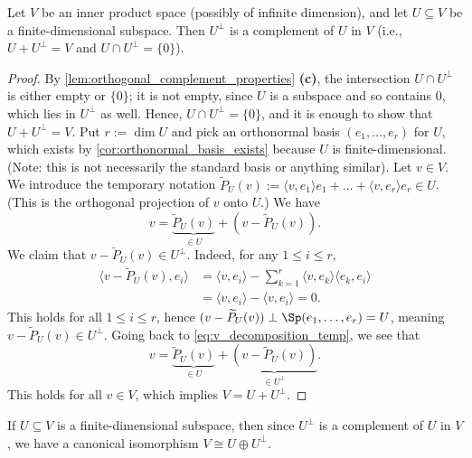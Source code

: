 \begin{theorem}
\label{thm:orthogonal_complement_finite_dim}
Let $V$ be an inner product space (possibly of infinite dimension), and let $U \subseteq V$ be a finite-di\-men\-sional subspace. Then $U^\perp$ is a complement of $U$ in $V$ (i.e., $U + U^\perp = V$ and $U \cap U^\perp = \{0\}$).
\end{theorem}

\begin{proof}
By \cref{lem:orthogonal_complement_properties} \textbf{(c)}, the intersection $U \cap U^\perp$ is either empty or $\{0\}$; it is not empty, since $U$ is a subspace and so contains $0$, which lies in $U^\perp$ as well. Hence, $U \cap U^\perp = \{0\}$, and it is enough to show that $U + U^\perp = V$.
Put $r := \dim U$ and pick an orthonormal basis $(e_1, \dots, e_r)$ for $U$, which exists by \cref{cor:orthonormal_basis_exists} because $U$ is finite-di\-men\-sional. (Note: this is not necessarily the standard basis or anything similar). Let $v \in V$.
We introduce the temporary notation $\widetilde{P}_U(v) := \langle v, e_1 \rangle e_1 + \dots + \langle v, e_r \rangle e_r \in U$. (This is the orthogonal projection of $v$ onto $U$.)
We have
\begin{equation}
\label{eq:v_decomposition_temp}
    v = \underbrace{\widetilde{P}_U(v)}_{\in U} + (v - \widetilde{P}_U(v)).
\end{equation}
We claim that $v - \widetilde{P}_U(v) \in U^\perp$. Indeed, for any $1 \leq i \leq r$,
\begin{align*}
    \langle v - \widetilde{P}_U(v), e_i \rangle &= \langle v, e_i \rangle - \sum_{k=1}^r \langle v, e_k \rangle \langle e_k, e_i \rangle \\
    &= \langle v, e_i \rangle - \langle v, e_i \rangle = 0.
\end{align*}
This holds for all $1 \leq i \leq r$, hence $(v - \widetilde{P}_U(v)) \perp \Sp(e_1, \dots, e_r) = U$, meaning $v - \widetilde{P}_U(v) \in U^\perp$.
Going back to \eqref{eq:v_decomposition_temp}, we see that
\[
    v = \underbrace{\widetilde{P}_U(v)}_{\in U} + \underbrace{(v - \widetilde{P}_U(v))}_{\in U^\perp}.
\]
This holds for all $v \in V$, which implies $V = U + U^\perp$.
\end{proof}

\begin{remark}
If $U \subseteq V$ is a finite-di\-men\-sional subspace, then since $U^\perp$ is a complement of $U$ in $V$, we have a canonical isomorphism $V \cong U \oplus U^\perp$.
\end{remark}

